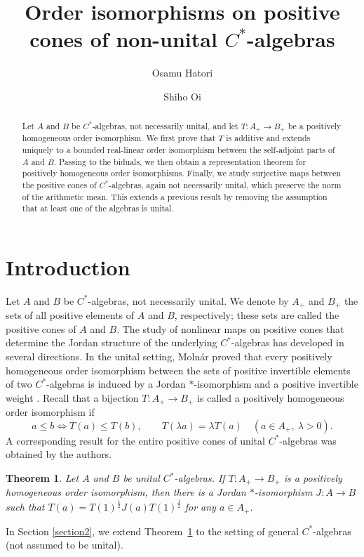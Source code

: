 \documentclass[12pt]{amsart}
\title[Order isomorphisms on  positive cones of $C^*$-algebras]
{Order isomorphisms on positive cones of non-unital $C^*$-algebras}
\author{Osamu Hatori}
\author{Shiho Oi}
\newtheorem{theorem}{Theorem}[section]
\theoremstyle{remark}
\begin{document}
\begin{abstract}
Let $A$ and $B$ be $C^*$-algebras, not necessarily unital, and let
$T:A_+\to B_+$ be a positively homogeneous order isomorphism.  We first
prove that $T$ is additive and extends uniquely to a bounded real-linear
order isomorphism between the self-adjoint parts of $A$ and $B$.  Passing
to the biduals, we then obtain a representation theorem for positively homogeneous order isomorphisms. Finally, we study surjective maps between the positive cones of $C^*$-algebras, again not necessarily unital, which preserve the norm of the arithmetic mean. This extends a previous result by removing the assumption that at least one of the algebras is unital.
\end{abstract}

\maketitle
\section{Introduction}

Let $A$ and $B$ be $C^*$-algebras, not necessarily unital.  We denote by $A_+$ and $B_+$ the sets of all positive elements of $A$ and $B$, respectively; these sets are called the positive cones of $A$ and $B$. The study of nonlinear maps on positive cones that determine the
Jordan structure of the underlying $C^*$-algebras has developed in
several directions. 
In the unital setting, Moln\'ar proved that every positively homogeneous order isomorphism between the sets of positive invertible elements of two $ C^*$-algebras is induced by a Jordan $*$-isomorphism and a positive invertible weight \cite[Proposition~13]{MolnarRenyi}. Recall that a bijection $T:A_+\to B_+$ is called a positively homogeneous order isomorphism if
\[
        a\le b\iff T(a)\le T(b),
        \qquad
        T(\lambda a)=\lambda T(a)
        \quad(a\in A_+,\ \lambda>0).
\]
A corresponding result for the entire positive cones of unital $C^*$-algebras was obtained by the authors.
\begin{theorem}\cite[Theorem~5.1]{HatoriOiPositiveCones}\label{unital}
    Let $A$ and $B$ be unital $C^{*}$-algebras. If $T: A_+\to B_+$ is a positively homogeneous order isomorphism, then there is a Jordan $*$-isomorphism $J:A \to B$ such that $T(a)=T(1)^{\frac{1}{2}}J(a)T(1)^{\frac{1}{2}}$ for any $a \in A_{+}$.  
\end{theorem}
In Section \ref{section2}, we extend Theorem~\ref{unital} to the setting of general $C^*$-algebras (not assumed to be unital).
\end{document}
